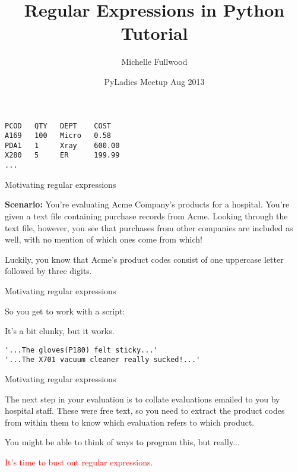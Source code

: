 \documentclass{beamer}
\title[Regexes in Python]{Regular Expressions in Python Tutorial}
\author{Michelle Fullwood}
\date{PyLadies Meetup Aug 2013}
\begin{document}
\begin{frame}
\titlepage
\end{frame}


\begin{lrbox}{\mysavebox}
\begin{lstlisting}
PCOD   QTY   DEPT    COST
A169   100   Micro   0.58
PDA1   1     Xray    600.00
X280   5     ER      199.99
...
\end{lstlisting}
\end{lrbox}

\begin{frame}{Motivating regular expressions}

{\bf Scenario:} You're evaluating Acme Company's products for a hospital.
You're given a text file containing purchase records from Acme.
Looking through the text file, however, you see that purchases from other companies
are included as well, with no mention of which ones come from which!

\vspace{1.5em}
{\usebox{\mysavebox}}
\vspace{1em}

Luckily, you know that Acme's product codes consist of one
uppercase letter followed by three digits.

\end{frame}


\begin{frame}{Motivating regular expressions}

So you get to work with a script:



It's a bit clunky, but it works.

\end{frame}

\begin{lrbox}{\mysavebox}
\begin{lstlisting}
'...The gloves(P180) felt sticky...'
'...The X701 vacuum cleaner really sucked!...'
\end{lstlisting}
\end{lrbox}

\begin{frame}{Motivating regular expressions}

The next step in your evaluation is to collate evaluations
emailed to you by hospital staff. These were free text,
so you need to extract the product codes from within them
to know which evaluation refers to which product.

\vspace{1.5em}
{\usebox{\mysavebox}}
\vspace{1em}

You might be able to think of ways to program this,
but really...

\begin{center}
\textcolor{red}{It's time to bust out regular expressions.}
\end{center}

\end{frame}
\end{document}
